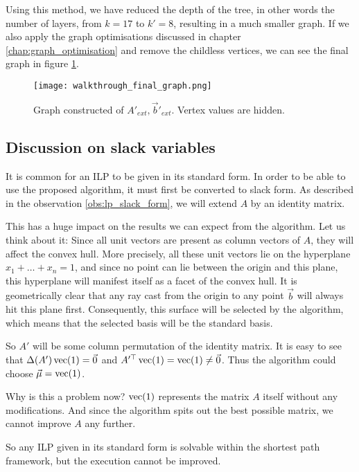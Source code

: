 Using this method, we have reduced the depth of the tree, in other words the number of layers, from $k=17$ to $k'=8$, resulting in a much smaller graph. If we also apply the graph optimisations discussed in chapter \ref{chap:graph_optimisation} and remove the childless vertices, we can see the final graph in figure \ref{fig:walkthrough_final_graph}.
\begin{figure}
    \centering
    \texttt{[image: walkthrough\_final\_graph.png]}
    \caption{\label{fig:walkthrough_final_graph} Graph constructed of $A'_{ext}, \vec b'_{ext}$. Vertex values are hidden.}
\end{figure}

\subsection{Discussion on slack variables}
It is common for an ILP to be given in its standard form. In order to be able to use the proposed algorithm, it must first be converted to slack form. As described in the observation \ref{obs:lp_slack_form}, we will extend $A$ by an identity matrix.

This has a huge impact on the results we can expect from the algorithm. Let us think about it: Since all unit vectors are present as column vectors of $A$, they will affect the convex hull. More precisely, all these unit vectors lie on the hyperplane $x_1 + \dots + x_n = 1$, and since no point can lie between the origin and this plane, this hyperplane will manifest itself as a facet of the convex hull. It is geometrically clear that any ray cast from the origin to any point $\vec b$ will always hit this plane first. Consequently, this surface will be selected by the algorithm, which means that the selected basis will be the standard basis.

So $A'$ will be some column permutation of the identity matrix. It is easy to see that $\Delta(A')\operatorname{vec}(1) = \vec 0$ and $A'^\top\operatorname{vec}(1) = \operatorname{vec}(1) \neq \vec0$. Thus the algorithm could choose $\vec\mu = \operatorname{vec}(1)$.

Why is this a problem now? $\operatorname{vec}(1)$ represents the matrix $A$ itself without any modifications. And since the algorithm spits out the best possible matrix, we cannot improve $A$ any further.

So any ILP given in its standard form is solvable within the shortest path framework, but the execution cannot be improved.